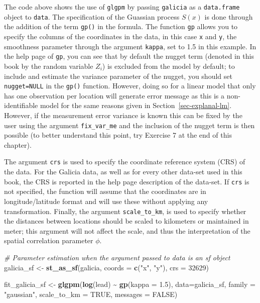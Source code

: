 \documentclass[
  letterpaper,
]{krantz}
\newenvironment{Shaded}{\begin{snugshade}}{\end{snugshade}}
\newcommand{\AttributeTok}[1]{\textcolor[rgb]{0.13,0.29,0.53}{#1}}
\newcommand{\CommentTok}[1]{\textcolor[rgb]{0.56,0.35,0.01}{\textit{#1}}}
\newcommand{\ConstantTok}[1]{\textcolor[rgb]{0.56,0.35,0.01}{#1}}
\newcommand{\DecValTok}[1]{\textcolor[rgb]{0.00,0.00,0.81}{#1}}
\newcommand{\FloatTok}[1]{\textcolor[rgb]{0.00,0.00,0.81}{#1}}
\newcommand{\FunctionTok}[1]{\textcolor[rgb]{0.13,0.29,0.53}{\textbf{#1}}}
\newcommand{\NormalTok}[1]{#1}
\newcommand{\OtherTok}[1]{\textcolor[rgb]{0.56,0.35,0.01}{#1}}
\newcommand{\SpecialCharTok}[1]{\textcolor[rgb]{0.81,0.36,0.00}{\textbf{#1}}}
\newcommand{\StringTok}[1]{\textcolor[rgb]{0.31,0.60,0.02}{#1}}
\begin{document}
The code above shows the use of \texttt{glgpm} by passing
\texttt{galicia} as a \texttt{data.frame} object to \texttt{data}. The
specification of the Guassian process \(S(x)\) is done through the
addition of the term \texttt{gp()} in the formula. The function
\texttt{gp} allows you to specify the columns of the coordinates in the
data, in this case \texttt{x} and \texttt{y}, the smoothness parameter
through the argument \texttt{kappa}, set to 1.5 in this example. In the
help page of \texttt{gp}, you can see that by default the nugget term
(denoted in this book by the random variable \(Z_i\)) is excluded from
the model by default; to include and estimate the variance parameter of
the nugget, you should set \texttt{nugget=NULL} in the \texttt{gp()}
function. However, doing so for a linear model that only has one
observation per location will generate error message as this is a
non-identifiable model for the same reasons given in
Section~\ref{sec-explanal-lm}. However, if the measurement error
variance is known this can be fixed by the user using the argument
\texttt{fix\_var\_me} and the inclusion of the nugget term is then
possible (to better understand this point, try Exercise 7 at the end of
this chapter).

The argument \texttt{crs} is used to specify the coordinate reference
system (CRS) of the data. For the Galicia data, as well as for every
other data-set used in this book, the CRS is reported in the help page
description of the data-set. If \texttt{crs} is not specified, the
function will assume that the coordinates are in longitude/latitude
format and will use these without applying any transformation. Finally,
the argument \texttt{scale\_to\_km}, is used to specify whether the
distances between locations should be scaled to kilometers or maintained
in meter; this argument will not affect the scale, and thus the
interpretation of the spatial correlation parameter \(\phi\).

\begin{Shaded}
\begin{Highlighting}[]
\CommentTok{\# Parameter estimation when the argument passed to \textasciigrave{}data\textasciigrave{} is an sf object}
\NormalTok{galicia\_sf }\OtherTok{\textless{}{-}} \FunctionTok{st\_as\_sf}\NormalTok{(galicia, }\AttributeTok{coords =} \FunctionTok{c}\NormalTok{(}\StringTok{"x"}\NormalTok{, }\StringTok{"y"}\NormalTok{), }\AttributeTok{crs =} \DecValTok{32629}\NormalTok{)}

\NormalTok{fit\_galicia\_sf }\OtherTok{\textless{}{-}} 
\FunctionTok{glgpm}\NormalTok{(}\FunctionTok{log}\NormalTok{(lead) }\SpecialCharTok{\textasciitilde{}} \FunctionTok{gp}\NormalTok{(}\AttributeTok{kappa =} \FloatTok{1.5}\NormalTok{), }\AttributeTok{data=}\NormalTok{galicia\_sf, }\AttributeTok{family =} \StringTok{"gaussian"}\NormalTok{,}
      \AttributeTok{scale\_to\_km =} \ConstantTok{TRUE}\NormalTok{, }\AttributeTok{messages =} \ConstantTok{FALSE}\NormalTok{)}
\end{Highlighting}
\end{Shaded}
\end{document}
